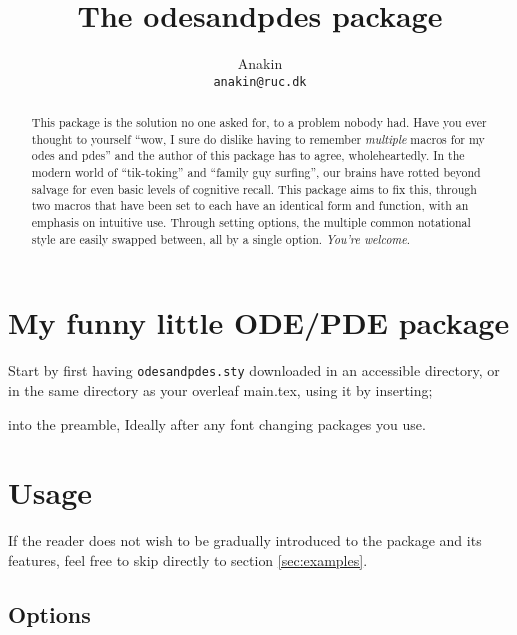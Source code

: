 \documentclass[11pt,a4paper]{ltxdoc}
\begin{document}
\author{Anakin\\ \texttt{anakin@ruc.dk}}
\title{The \textsf{odesandpdes} package}

\maketitle

\begin{abstract}
This package is the solution no one asked for, to a problem 
nobody had. Have you ever thought to yourself ``wow, I sure do
dislike having to remember \emph{multiple} macros for my odes and pdes''
and the author of this package has to agree, wholeheartedly.
In the modern world of ``tik-toking'' and ``family guy surfing'', 
our brains have rotted beyond salvage for even basic levels of 
cognitive recall. This package aims to fix this, through two
macros that have been set to each have an identical form and 
function, with an emphasis on intuitive use.
Through setting options, the multiple
common notational style are easily
swapped between, all by a single option.
\emph{You're welcome}.
\end{abstract}




{\setlength{\parskip}{0.25ex}\small
\tableofcontents}



\newpage
\section*{My funny little ODE/PDE package}
\hspace{1em} Start by first having \verb|odesandpdes.sty| downloaded in an
accessible directory, or in the same directory as your 
overleaf main.tex, using it by inserting; 
\begin{center}
\end{center}
into the preamble, Ideally after any font changing packages you use.

\section{Usage}

If the reader does not wish to be gradually introduced to the package
and its features, feel free to skip directly to section \ref{sec:examples}.

\subsection{Options}
\end{document}
